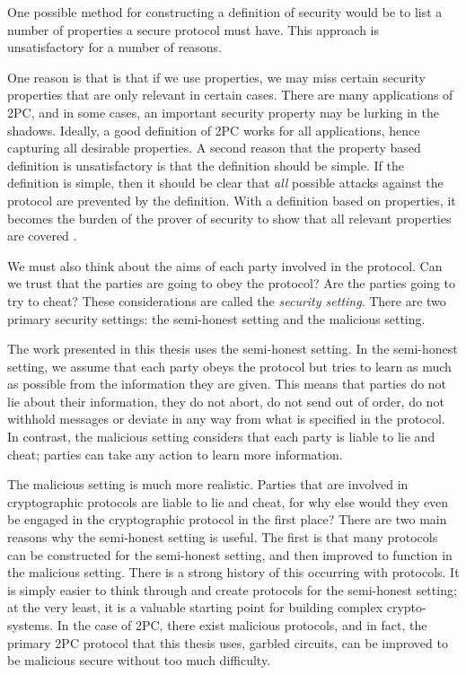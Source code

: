 One possible method for constructing a definition of security would be to list a number of properties a secure protocol must have.
This approach is unsatisfactory for a number of reasons.

One reason is that is that if we use properties, we may miss certain security properties that are only relevant in certain cases. 
There are many applications of 2PC, and in some cases, an important security property may be lurking in the shadows. 
Ideally, a good definition of 2PC works for all applications, hence capturing all desirable properties.
A second reason that the property based definition is unsatisfactory is that the definition should be simple.
If the definition is simple, then it should be clear that \textit{all} possible attacks against the protocol are prevented by the definition.
With a definition based on properties, it becomes the burden of the prover of security to show that all relevant properties are covered \cite{lindell2009}.

We must also think about the aims of each party involved in the protocol. 
Can we trust that the parties are going to obey the protocol? 
Are the parties going to try to cheat?
These considerations are called the \textit{security setting}.
There are two primary security settings: the semi-honest setting and the malicious setting. 

The work presented in this thesis uses the semi-honest setting. 
In the semi-honest setting, we assume that each party obeys the protocol but tries to learn as much as possible from the information they are given.
This means that parties do not lie about their information, they do not abort, do not send out of order, do not withhold messages or deviate in any way from what is specified in the protocol. 
In contrast, the malicious setting considers that each party is liable to lie and cheat; parties can take any action to learn more information.

The malicious setting is much more realistic. 
Parties that are involved in cryptographic protocols are liable to lie and cheat, for why else would they even be engaged in the cryptographic protocol in the first place?
There are two main reasons why the semi-honest setting is useful.
The first is that many protocols can be constructed for the semi-honest setting, and then improved to function in the malicious setting.
There is a strong history of this occurring with protocols.
It is simply easier to think through and create protocols for the semi-honest setting; at the very least, it is a valuable starting point for building complex crypto-systems.
In the case of 2PC, there exist malicious protocols, and in fact, the primary 2PC protocol that this thesis uses, garbled circuits, can be improved to be malicious secure without too much difficulty. 

